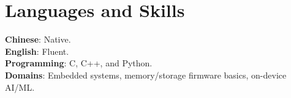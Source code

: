 \documentclass[letterpaper,11pt]{article}
\begin{document}
\section{Languages and Skills}
 \begin{itemize}[leftmargin=0.15in, label={}]
    \small{\item{
     \textbf{Chinese}{: Native.} \\
     \textbf{English}{: Fluent.} \\
     \textbf{Programming}{: C, C++, and Python.} \\
     \textbf{Domains}{: Embedded systems, memory/storage firmware basics, on-device AI/ML.}
    }}
 \end{itemize}
\end{document}
